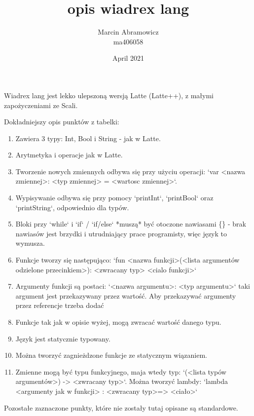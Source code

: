 \documentclass{article}
\title{opis wiadrex lang}
\author{Marcin Abramowicz \\ ma406058}
\date{April 2021}
\newcommand\setItemnumber[1]{\setcounter{enumi}{\numexpr#1-1\relax}}
\begin{document}
    \maketitle

    Wiadrex lang jest lekko ulepszoną wersją Latte (Latte++), z małymi zapożyczeniami ze Scali.

    Dokładniejszy opis punktów z tabelki:

    \begin{enumerate}
        \item
            Zawiera 3 typy: Int, Bool i String - jak w Latte.

        \item
            Arytmetyka i operacje jak w Latte.

        \item
            Tworzenie nowych zmiennych odbywa się przy użyciu operacji: `var <nazwa zmiennej>: <typ zmiennej> = <wartosc zmiennej>`.

        \item
            Wypisywanie odbywa się przy pomocy `printInt`, `printBool` oraz `printString`, odpowiednio dla typów.

        \item
            Bloki przy `while` i `if` / `if/else` *muszą* być otoczone nawiasami \{\} - brak nawiasów jest brzydki i utrudniający prace programisty, więc język to wymusza.

        \item
            Funkcje  tworzy się następująco: `fun <nazwa funkcji>(<lista argumentów odzielone przecinkiem>): <zwracany typ> {<cialo funkcji>}`

        \item
            Argumenty funkcji są postaci: `<nazwa argumentu>: <typ argumentu>` taki argument jest przekazywany przez wartość. Aby przekazywać argumenty przez referencje trzeba dodać 

        \setItemnumber{11}
        \item
            Funkcje tak jak w opisie wyżej, mogą zwracać wartość danego typu.

        \setItemnumber{12}
        \item
            Język jest statycznie typowany.

        \setItemnumber{13}
        \item
            Można tworzyć zagnieżdzone funkcje ze statycznym wiązaniem.

        \setItemnumber{17}
        \item
            Zmienne mogą być typu funkcyjnego, maja wtedy typ: `(<lista typów argumentów>) -> <zwracany typ>`. Można tworzyć lambdy: `lambda <argumenty jak w funkcji> : <zwracany typ>=> {<ciało>}`
    \end{enumerate}
    
    Pozostałe zaznaczone punkty, które nie zostały tutaj opisane są standardowe.
    
\end{document}
